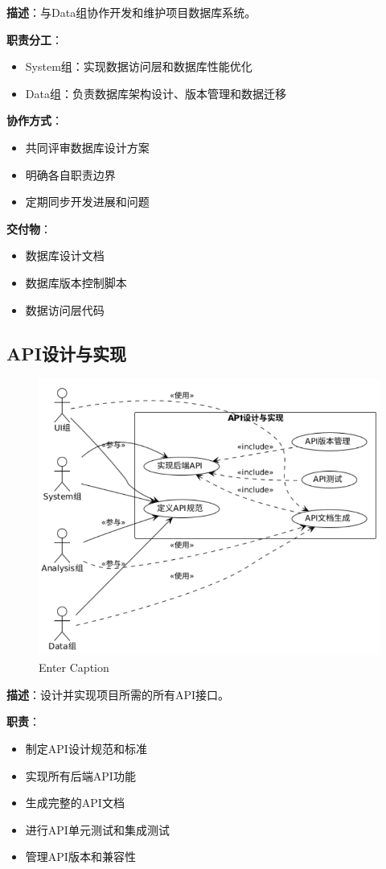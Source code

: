 \documentclass[a4paper,12pt]{article}
\begin{document}
\textbf{描述}：与Data组协作开发和维护项目数据库系统。

\textbf{职责分工}：
\begin{itemize}
  \item System组：实现数据访问层和数据库性能优化
  \item Data组：负责数据库架构设计、版本管理和数据迁移
\end{itemize}

\textbf{协作方式}：
\begin{itemize}
  \item 共同评审数据库设计方案
  \item 明确各自职责边界
  \item 定期同步开发进展和问题
\end{itemize}

\textbf{交付物}：
\begin{itemize}
  \item 数据库设计文档
  \item 数据库版本控制脚本
  \item 数据访问层代码
\end{itemize}

\subsection{API设计与实现}

\begin{figure}[H]
    \centering
    \includegraphics[width=0.75\linewidth]{assets/image4.png}
    \caption{Enter Caption}
    \label{fig:enter-label}
\end{figure}

\textbf{描述}：设计并实现项目所需的所有API接口。

\textbf{职责}：
\begin{itemize}
  \item 制定API设计规范和标准
  \item 实现所有后端API功能
  \item 生成完整的API文档
  \item 进行API单元测试和集成测试
  \item 管理API版本和兼容性
\end{itemize}
\end{document}
